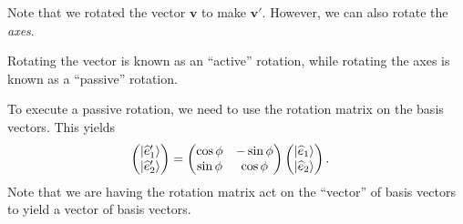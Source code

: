 \documentclass[10pt]{mypackage}
\begin{document}
Note that we rotated the vector $\mathbf{v}$ to make $\mathbf{v}'$. However, we can also rotate the \textit{axes}.\newline

Rotating the vector is known as an ``active'' rotation, while rotating the axes is known as a ``passive'' rotation.\newline

To execute a passive rotation, we need to use the rotation matrix on the basis vectors. This yields
\begin{align*}
  \begin{pmatrix}\ket{\widehat{e}_1'}\\\ket{\widehat{e}_2'}\end{pmatrix} &= \begin{pmatrix}\cos\phi & -\sin\phi \\ \sin\phi & \cos\phi\end{pmatrix} \begin{pmatrix}\ket{\widehat{e}_1}\\\ket{\widehat{e}_2}\end{pmatrix}.
\end{align*}
Note that we are having the rotation matrix act on the ``vector'' of basis vectors to yield a vector of basis vectors.
\end{document}
